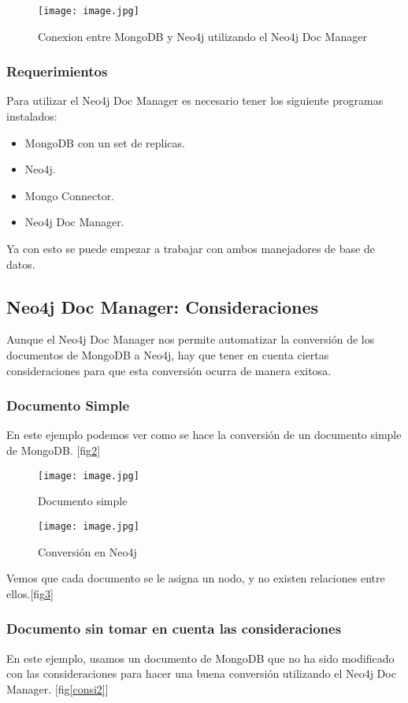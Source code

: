 \documentclass[conference,compsoc]{IEEEtran}
\begin{document}
\begin{figure}[!h]
\centering
\texttt{[image: image.jpg]}
\caption{Conexion entre MongoDB y Neo4j utilizando el Neo4j Doc Manager\cite{art13}}
\label{doc-manager1}
\end{figure}

\subsubsection{Requerimientos}
Para utilizar el Neo4j Doc Manager es necesario tener los siguiente programas instalados:
\begin{itemize}
\item MongoDB con un set de replicas.
\item Neo4j.
\item Mongo Connector.
\item Neo4j Doc Manager.
\end{itemize}

Ya con esto se puede empezar a trabajar con ambos manejadores de base de datos.

\subsection{Neo4j Doc Manager: Consideraciones}
Aunque el Neo4j Doc Manager nos permite automatizar la conversión de los documentos de MongoDB a Neo4j, hay que tener en cuenta ciertas consideraciones para que esta conversión ocurra de manera exitosa.

\subsubsection{Documento Simple}
En este ejemplo podemos ver como se hace la conversión de un documento simple de MongoDB. [fig\ref{consi1}]

\begin{figure}[!h]
\centering
\texttt{[image: image.jpg]}
\caption{Documento simple}
\label{consi1}
\end{figure}

\begin{figure}[!h]
\centering
\texttt{[image: image.jpg]}
\caption{Conversión en Neo4j}
\label{consi1-2}
\end{figure}

Vemos que cada documento se le asigna un nodo, y no existen relaciones entre ellos.[fig\ref{consi1-2}]

\subsubsection{Documento sin tomar en cuenta las consideraciones}
En este ejemplo, usamos un documento de MongoDB que no ha sido modificado con las consideraciones para hacer una buena conversión utilizando el Neo4j Doc Manager. [fig\ref{consi2}]
\end{document}

